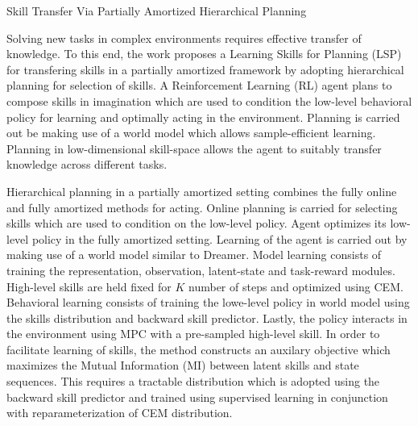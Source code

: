 \documentclass[11pt,letterpaper]{article}
\begin{document}
\begin{center}
  \large{Skill Transfer Via Partially Amortized Hierarchical Planning}
\end{center}

Solving new tasks in complex environments requires effective transfer of knowledge. To this end, the work proposes a Learning Skills for Planning (LSP) for transfering skills in a partially amortized framework by adopting hierarchical planning for selection of skills. A Reinforcement Learning (RL) agent plans to compose skills in imagination which are used to condition the low-level behavioral policy for learning and optimally acting in the environment. Planning is carried out be making use of a world model which allows sample-efficient learning. Planning in low-dimensional skill-space allows the agent to suitably transfer knowledge across different tasks. 

Hierarchical planning in a partially amortized setting combines the fully online and fully amortized methods for acting. Online planning is carried for selecting skills which are used to condition on the low-level policy. Agent optimizes its low-level policy in the fully amortized setting. Learning of the agent is carried out by making use of a world model similar to Dreamer. Model learning consists of training the representation, observation, latent-state and task-reward modules. High-level skills are held fixed for $K$ number of steps and optimized using CEM. Behavioral learning consists of training the lowe-level policy in world model using the skills distribution and backward skill predictor. Lastly, the policy interacts in the environment using MPC with a pre-sampled high-level skill. In order to facilitate learning of skills, the method constructs an auxilary objective which maximizes the Mutual Information (MI) between latent skills and state sequences. This requires a tractable distribution which is adopted using the backward skill predictor and trained using supervised learning in conjunction with reparameterization of CEM distribution. 
\end{document}
